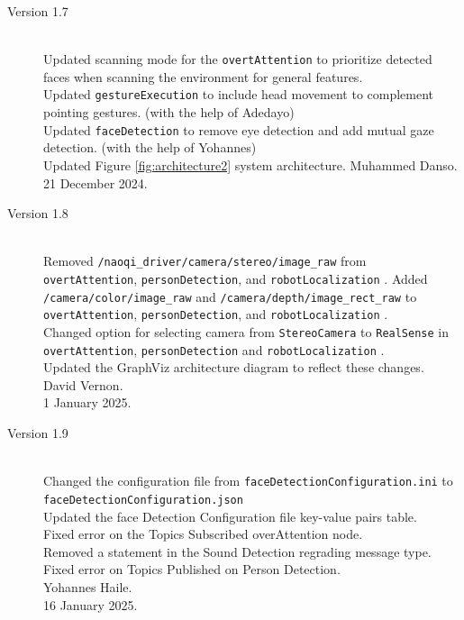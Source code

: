 \documentclass{CSSRforAfrica}
\begin{document}
{{\begin{description}
\item [Version 1.7]~\\
Updated scanning mode for the {\small \verb+overtAttention+} to prioritize detected faces when scanning the environment for general features.\\
Updated {\small \verb+gestureExecution+} to include head movement to complement pointing gestures. (with the help of Adedayo)\\
Updated  {\small \verb+faceDetection+} to remove eye detection and add mutual gaze detection. (with the help of Yohannes)\\
Updated Figure \ref{fig:architecture2} system architecture.
Muhammed Danso. \\                          
21 December 2024.

\item [Version 1.8]~\\
Removed {\small \verb+/naoqi_driver/camera/stereo/image_raw+ } from {\small \verb+overtAttention+}, {\small \verb+personDetection+}, and {\small \verb+robotLocalization+} .
Added {\small \verb+/camera/color/image_raw+ } and {\small \verb+/camera/depth/image_rect_raw+ }  to  {\small \verb+overtAttention+}, {\small \verb+personDetection+}, and {\small \verb+robotLocalization+} .\\ 
Changed option for selecting camera from {\small \verb+StereoCamera+}  to {\small \verb+RealSense+} in   {\small \verb+overtAttention+}, {\small \verb+personDetection+} and {\small \verb+robotLocalization+} . \\
Updated the GraphViz architecture diagram to reflect these changes.\\
David Vernon. \\                          
1 January 2025.

\item [Version 1.9]~\\
Changed the configuration file from \texttt{faceDetectionConfiguration.ini} to \\ \texttt{faceDetectionConfiguration.json}\\
Updated the face Detection Configuration file key-value pairs table. \\
Fixed error on the Topics Subscribed overAttention node. \\
Removed a statement in the Sound Detection regrading message type.\\
Fixed error on Topics Published on Person Detection.\\
Yohannes Haile. \\
16 January 2025.


\end{description}}}
\end{document}
